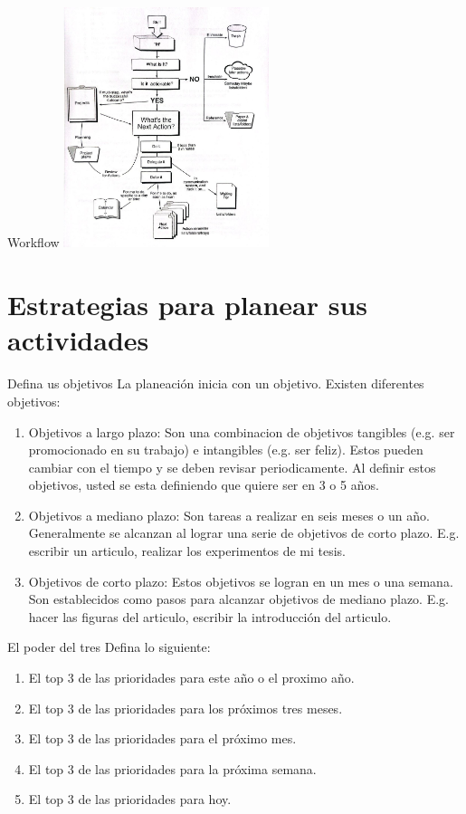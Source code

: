 \documentclass[
10pt,
aspectratio=169,
]{beamer}
\begin{document}
\begin{frame}[c]{Workflow}
\centering
\includegraphics[width=0.45\textwidth]{workf.jpeg}
\end{frame}
\section{Estrategias para planear sus actividades}
\begin{frame}[c]{Defina us objetivos}
La planeaci\'on inicia con un objetivo. Existen diferentes objetivos:
\begin{enumerate}
\item \alert{Objetivos a largo plazo}: Son una combinacion de objetivos tangibles (e.g. ser promocionado en su trabajo) e intangibles (e.g. ser feliz). Estos pueden cambiar con el tiempo y se deben revisar periodicamente. Al definir estos objetivos, usted se esta definiendo que quiere ser en 3 o 5 a\~nos.
\item \alert{Objetivos a mediano plazo}: Son tareas a realizar en seis meses o un a\~no. Generalmente se alcanzan al lograr una serie de objetivos de corto plazo. E.g. escribir un articulo, realizar los experimentos de mi tesis. 
\item \alert{Objetivos de corto plazo}: Estos objetivos se logran en un mes o una semana. Son establecidos como pasos para alcanzar objetivos de mediano plazo. E.g. hacer las figuras del articulo, escribir la introducci\'on del articulo. 
\end{enumerate}
\end{frame}

\begin{frame}[c]{El poder del tres}
Defina lo siguiente:
\begin{enumerate}
\item El top 3 de las prioridades para este a\~no o el proximo a\~no.
\item El top 3 de las prioridades para los pr\'oximos tres meses. 
\item El top 3 de las prioridades para el pr\'oximo mes.
\item El top 3 de las prioridades para la pr\'oxima semana.
\item El top 3 de las prioridades para hoy.
\end{enumerate}
\end{frame}
\end{document}
